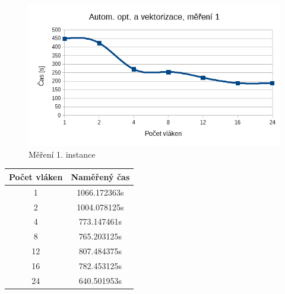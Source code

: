 \documentclass[12pt]{article}
\begin{document}
\begin{figure}[H]
  \begin{center}
     \includegraphics[width=12cm]{images/auto1.png}
    \caption{Měření 1. instance} 
  \end{center}
\end{figure}
%
%
\begin{center}
\begin{tabular}{ c | c }
\textbf{Počet vláken} & \textbf{Naměřený čas} \\ \hline \hline 
1 & 1066.172363s \\ \hline
2 & 1004.078125s \\ \hline
4 & 773.147461s \\ \hline
8 & 765.203125s \\ \hline
12 & 807.484375s \\ \hline
16 & 782.453125s \\ \hline
24 & 640.501953s \\ \hline
\end{tabular}
\end{center}
\end{document}
